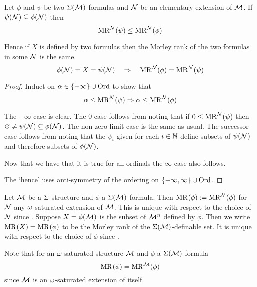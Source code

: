 \begin{prop}%
    Let $\phi$ and $\psi$ be two $\Sigma(\mathcal{M})$-formulas
    and $\mathcal{N}$ be an elementary extension of $\mathcal{M}$.
    If $\psi(\mathcal{N}) \subseteq \phi(\mathcal{N})$ then
    \[\mathrm{MR}^{\mathcal{N}}(\psi) \leq \mathrm{MR}^{\mathcal{N}}(\phi)\]

    Hence if $X$ is defined by two formulas then the Morley 
    rank of the two formulas in some $\mathcal{N}$ is the same.
    \[
        \phi(\mathcal{N}) = X = \psi(\mathcal{N}) 
        \quad \Rightarrow \quad 
        \mathrm{MR}^{\mathcal{N}}(\phi) = \mathrm{MR}^{\mathcal{N}}(\psi)
    \]
\end{prop}
\begin{proof}
    Induct on $\alpha \in \left\{-\infty\right\} \cup \operatorname{Ord}$ to show that 
    \[\alpha \leq \mathrm{MR}^{\mathcal{N}}(\psi) \Rightarrow \alpha \leq \mathrm{MR}^{\mathcal{N}}(\phi)\]

    The $-\infty$ case is clear.
    The $0$ case follows from noting that if 
    $0 \leq \mathrm{MR}^{\mathcal{N}}(\psi)$ then $\varnothing \ne \psi(\mathcal{N}) \subseteq \phi(\mathcal{N})$.
    The non-zero limit case is the same as usual.
    The successor case follows from noting that the
    $\psi_i$ given for each $i \in \mathbb{N}$ define subsets of $\psi(\mathcal{N})$ and 
    therefore subsets of $\phi(\mathcal{N})$.

    Now that we have that it is true for all ordinals the $\infty$ case also
    follows.

    The `hence' uses anti-symmetry of the ordering on 
    $\left\{-\infty,\infty\right\} \cup \operatorname{Ord}$.
\end{proof}

\begin{dfn}
    Let $\mathcal{M}$ be a $\Sigma$-structure and $\phi$ a $\Sigma(\mathcal{M})$-formula.
    Then $\mathrm{MR}^{}(\phi) := \mathrm{MR}^{\mathcal{N}}(\phi)$ for $\mathcal{N}$ any $\omega$-saturated extension 
    of $\mathcal{M}$.
    This is unique with respect to the choice of $\mathcal{N}$ since 
    .
    Suppose $X = \phi(\mathcal{M})$ is the subset of $\mathcal{M}^n$ defined by $\phi$.
    Then we write $\mathrm{MR}^{}(X) = \mathrm{MR}^{}(\phi)$ to be the Morley rank of the
    $\Sigma(\mathcal{M})$-definable set.
    It is unique with respect to the choice of $\phi$ since
    .
\end{dfn}
Note that for an $\omega$-saturated structure $\mathcal{M}$ and $\phi$ a $\Sigma(\mathcal{M})$-formula
\[\mathrm{MR}^{}(\phi) = \mathrm{MR}^{\mathcal{M}}(\phi)\]
since $\mathcal{M}$ is an $\omega$-saturated extension of itself.

